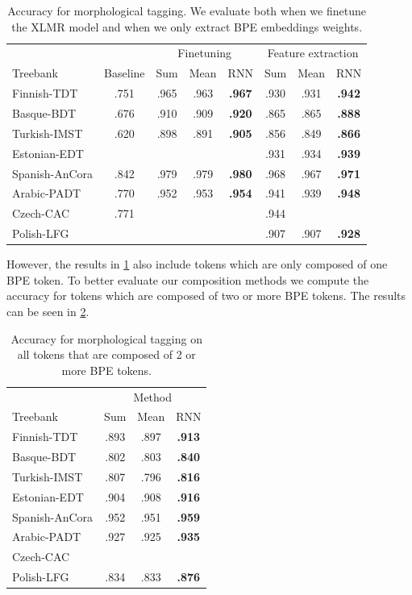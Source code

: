 \documentclass[11pt]{article}
\begin{document}
	\begin{table}[h]
	\centering
	\begin{tabular}{l|c|ccc|ccc}
		& & \multicolumn{3}{c}{Finetuning} & \multicolumn{3}{c}{Feature extraction} \\
		Treebank & Baseline & Sum & Mean & RNN & Sum & Mean & RNN \\
		\hline
		Finnish-TDT & .751 & .965 & .963 & \textbf{.967} & .930 & .931 & \textbf{.942} \\ 
		Basque-BDT & .676 & .910 & .909 & \textbf{.920} & .865 & .865 & \textbf{.888} \\
		Turkish-IMST & .620 & .898 & .891 & \textbf{.905} & .856 & .849 & \textbf{.866}\\
		Estonian-EDT & & & & & .931 & .934 & \textbf{.939} \\
		Spanish-AnCora & .842 & .979 & .979 & \textbf{.980} & .968 & .967 & \textbf{.971} \\
		Arabic-PADT & .770 & .952 & .953&\textbf{.954} & .941 & .939 & \textbf{.948} \\
		Czech-CAC & .771 &  &  &  & .944 &  &  \\
		Polish-LFG & & & &  & .907 & .907 & \textbf{.928} \\
	\end{tabular}
	\caption{\label{tab:results_tokens} Accuracy for morphological tagging. We evaluate both when we finetune the XLMR model and when we only extract BPE embeddings weights.}
	\end{table}

	However, the results in \cref{tab:results_tokens} also include tokens which are only composed of one BPE token. To better evaluate our composition methods we compute the accuracy for tokens which are composed of two or more BPE tokens. The results can be seen in \cref{tab:results_large_tokens}.

	\begin{table}[h]
	\centering
	\begin{tabular}{l|ccc}
		 & \multicolumn{3}{c}{Method} \\
		Treebank & Sum & Mean & RNN \\
		 		\hline
		Finnish-TDT & .893 & .897 & \textbf{.913} \\ 
		Basque-BDT  & .802 & .803 & \textbf{.840} \\
		Turkish-IMST & .807 & .796 & \textbf{.816} \\
		Estonian-EDT & .904 & .908 & \textbf{.916} \\
		Spanish-AnCora & .952 & .951 & \textbf{.959} \\
		Arabic-PADT & .927 & .925 & \textbf{.935}\\
		Czech-CAC & & & \\
		Polish-LFG & .834 & .833 & \textbf{.876} \\
	\end{tabular}
	\caption{\label{tab:results_large_tokens} Accuracy for morphological tagging on all tokens that are composed of 2 or more BPE tokens.}
\end{table}
\end{document}
